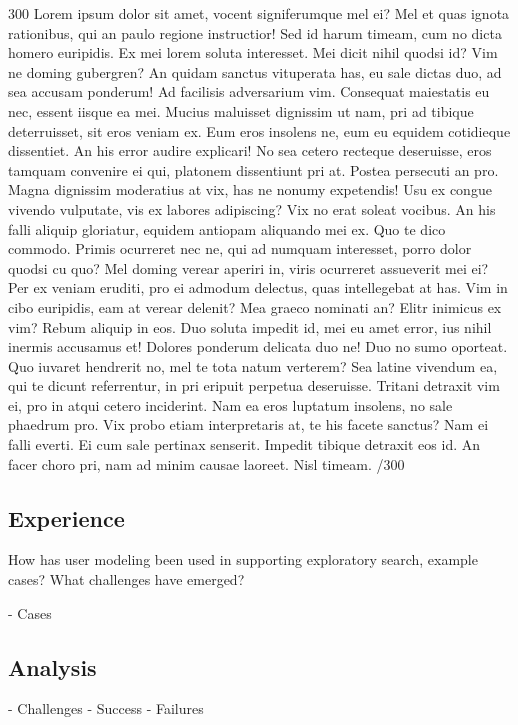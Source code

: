 \documentclass{sigchi}
\begin{document}
300 Lorem ipsum dolor sit amet, vocent signiferumque mel ei? Mel et quas ignota rationibus, qui an paulo regione instructior! Sed id harum timeam, cum no dicta homero euripidis. Ex mei lorem soluta interesset. Mei dicit nihil quodsi id? Vim ne doming gubergren? An quidam sanctus vituperata has, eu sale dictas duo, ad sea accusam ponderum! Ad facilisis adversarium vim. Consequat maiestatis eu nec, essent iisque ea mei. Mucius maluisset dignissim ut nam, pri ad tibique deterruisset, sit eros veniam ex. Eum eros insolens ne, eum eu equidem cotidieque dissentiet. An his error audire explicari! No sea cetero recteque deseruisse, eros tamquam convenire ei qui, platonem dissentiunt pri at. Postea persecuti an pro. Magna dignissim moderatius at vix, has ne nonumy expetendis! Usu ex congue vivendo vulputate, vis ex labores adipiscing? Vix no erat soleat vocibus. An his falli aliquip gloriatur, equidem antiopam aliquando mei ex. Quo te dico commodo. Primis ocurreret nec ne, qui ad numquam interesset, porro dolor quodsi cu quo? Mel doming verear aperiri in, viris ocurreret assueverit mei ei? Per ex veniam eruditi, pro ei admodum delectus, quas intellegebat at has. Vim in cibo euripidis, eam at verear delenit? Mea graeco nominati an? Elitr inimicus ex vim? Rebum aliquip in eos. Duo soluta impedit id, mei eu amet error, ius nihil inermis accusamus et! Dolores ponderum delicata duo ne! Duo no sumo oporteat. Quo iuvaret hendrerit no, mel te tota natum verterem? Sea latine vivendum ea, qui te dicunt referrentur, in pri eripuit perpetua deseruisse. Tritani detraxit vim ei, pro in atqui cetero inciderint. Nam ea eros luptatum insolens, no sale phaedrum pro. Vix probo etiam interpretaris at, te his facete sanctus? Nam ei falli everti. Ei cum sale pertinax senserit. Impedit tibique detraxit eos id. An facer choro pri, nam ad minim causae laoreet. Nisl timeam. /300

\subsection{Experience}

How has user modeling been used in supporting exploratory search, example cases? What challenges have emerged? 

- Cases

\subsection{Analysis}

- Challenges
- Success
- Failures
\end{document}
